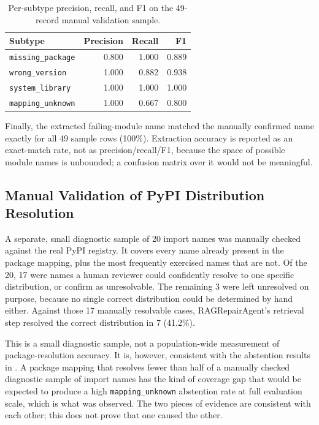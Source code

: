 \begin{table}[htbp]
  \centering
  \begin{tabular}{|l|r|r|r|}
    \hline
    \textbf{Subtype} & \textbf{Precision} & \textbf{Recall} & \textbf{F1} \\
    \hline
    \texttt{missing\_package} & 0.800 & 1.000 & 0.889 \\
    \hline
    \texttt{wrong\_version} & 1.000 & 0.882 & 0.938 \\
    \hline
    \texttt{system\_library} & 1.000 & 1.000 & 1.000 \\
    \hline
    \texttt{mapping\_unknown} & 1.000 & 0.667 & 0.800 \\
    \hline
  \end{tabular}
  \caption{Per-subtype precision, recall, and F1 on the 49-record manual
  validation sample.}
  \label{tab:v-final-classifier}
\end{table}

Finally, the extracted failing-module name matched the manually
confirmed name exactly for all 49 sample rows (100\%). Extraction
accuracy is reported as an exact-match rate, not as precision/recall/F1,
because the space of possible module names is unbounded; a confusion
matrix over it would not be meaningful.

\subsection{Manual Validation of PyPI Distribution Resolution}
\label{sec:v-final-pypi}

A separate, small diagnostic sample of 20 import names was manually
checked against the real PyPI registry. It covers every name already
present in the package mapping, plus the most frequently exercised
names that are not. Of the 20, 17 were names a human reviewer could
confidently resolve to one specific distribution, or confirm as
unresolvable. The remaining 3 were left unresolved on purpose, because
no single correct distribution could be determined by hand either.
Against those 17 manually resolvable cases, RAGRepairAgent's retrieval
step resolved the correct distribution in 7 (41.2\%).

This is a small diagnostic sample, not a population-wide measurement of
package-resolution accuracy. It is, however, consistent with the
abstention results in . A package mapping
that resolves fewer than half of a manually checked diagnostic sample of
import names has the kind of coverage gap that would be expected to
produce a high \texttt{mapping\_unknown} abstention rate at full
evaluation scale, which is what was observed. The two pieces of evidence
are consistent with each other; this does not prove that one caused the
other.

